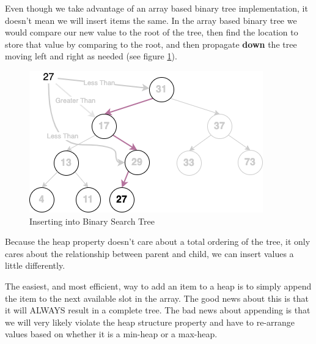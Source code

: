 
Even though we take advantage of an array based binary tree implementation, it doesn't mean we will insert items the same. In the array based binary tree we would compare our new value to the root of the tree, then find the location to store that value by comparing to the root, and then propagate \textbf{down} the tree moving left and right as needed (see figure \ref{fig:insbintree}).\\


\begin{figure}[h!]
	\centering
	\includegraphics[width=.45\textwidth]{images/binary_tree_insert.png}
	\caption{Inserting into Binary Search Tree}
	\label{fig:insbintree}
\end{figure}

Because the heap property doesn't care about a total ordering of the tree, it only cares about the relationship between parent and child, we can insert values a little differently.\\


The easiest, and most efficient, way to add an item to a heap is to simply append the item to the next available slot in the array. The good news about this is that it will ALWAYS result in a complete tree. The bad news about appending is that we will very likely violate the heap structure property and have to re-arrange values based on whether it is a min-heap or a max-heap.\\



